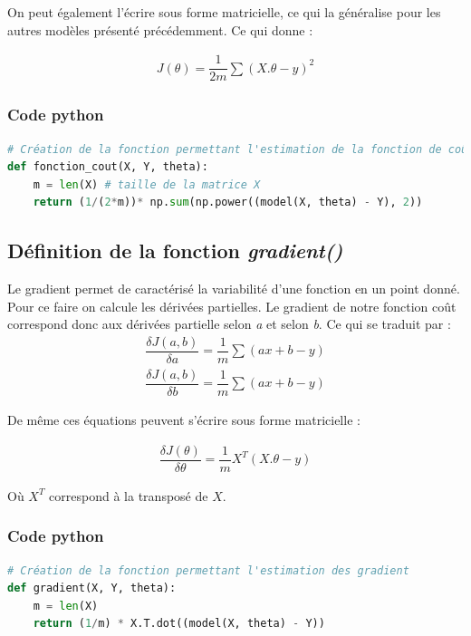 \documentclass[french]{article}
\begin{document}
\noindent On peut également l'écrire sous forme matricielle, ce qui la généralise pour les autres modèles présenté précédemment. Ce qui donne :

\begin{align*}
    J(\theta) = \dfrac{1}{2m}\sum(X.\theta - y)^2
\end{align*}

\subsubsection{Code python}

\begin{lstlisting}[language=Python]
# Création de la fonction permettant l'estimation de la fonction de coût
def fonction_cout(X, Y, theta):
    m = len(X) # taille de la matrice X
    return (1/(2*m))* np.sum(np.power((model(X, theta) - Y), 2))
\end{lstlisting}

\subsection{Définition de la fonction \textit{gradient()}}
Le gradient permet de caractérisé la variabilité d'une fonction en un point donné. Pour ce faire on calcule les dérivées partielles. Le gradient de notre fonction coût correspond donc aux dérivées partielle selon \textit{a} et selon \textit{b}. Ce qui se traduit par :
\begin{align*}
    \dfrac{\delta J(a,b)}{\delta a} = \dfrac{1}{m}\sum(ax + b - y) \\
    \dfrac{\delta J(a,b)}{\delta b} = \dfrac{1}{m}\sum(ax + b - y)
\end{align*}

\noindent De même ces équations peuvent s'écrire sous forme matricielle :

\begin{align*}
    \dfrac{\delta J(\theta)}{\delta \theta} = \dfrac{1}{m}X^{T}(X.\theta - y)
\end{align*}

\noindent Où $X^{T}$ correspond à la transposé de $X$.

\subsubsection{Code python}

\begin{lstlisting}[language=Python]
# Création de la fonction permettant l'estimation des gradient
def gradient(X, Y, theta):
    m = len(X)
    return (1/m) * X.T.dot((model(X, theta) - Y))
\end{lstlisting}
\end{document}
